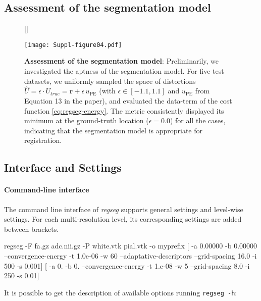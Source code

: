 \documentclass[a4paper]{report}
\renewcommand{\vec}[1]{\mathbf{#1}}
\newcommand*{\codeinline}[1]{\colorbox{listingbg}{\lstinline!#1!}}
\begin{document}
\subsection{Assessment of the segmentation model}
\begin{figure}[!ht]
  [\FBwidth]
  {\caption{\textbf{Assessment of the segmentation model}:
  Preliminarily, we investigated the aptness of the segmentation model.
  For five test datasets, we uniformly sampled the space of distortions
    $\hat{U} = \epsilon \cdot U_{true} = \vec{r} + \epsilon \, u_\text{PE}$
    (with $\epsilon \in [-1.1, 1.1]$ and $u_\text{PE}$ from Equation 13 in the
    paper), and evaluated the data-term of the cost function \eqref{eq:regseg-energy}.
  The metric consistently displayed its minimum at the ground-truth location ($\epsilon=0.0$)
    for all the cases, indicating that the segmentation model is appropriate for
    registration.}}
  {\texttt{[image: Suppl-figure04.pdf]}}
  \label{fig:regseg-energymap}
\end{figure}

\subsection{Interface and Settings}\label{sec:regseg-interface_settings}

\paragraph{Command-line interface}
The command line interface of \emph{regseg} supports general settings and level-wise settings.
For each multi-resolution level, its corresponding settings are added between brackets.

\begin{bashcode}
regseg -F fa.gz adc.nii.gz -P white.vtk pial.vtk -o myprefix [ -a 0.00000 -b 0.00000 --convergence-energy -t 1.0e-06 -w 60 --adaptative-descriptors --grid-spacing 16.0 -i 500 -s 0.001] [ -a 0. -b 0. --convergence-energy -t 1.e-08 -w 5 --grid-spacing 8.0 -i 250 -s 0.01]
\end{bashcode}


It is possible to get the description of available options running
  \codeinline{regseg -h}:
\end{document}
